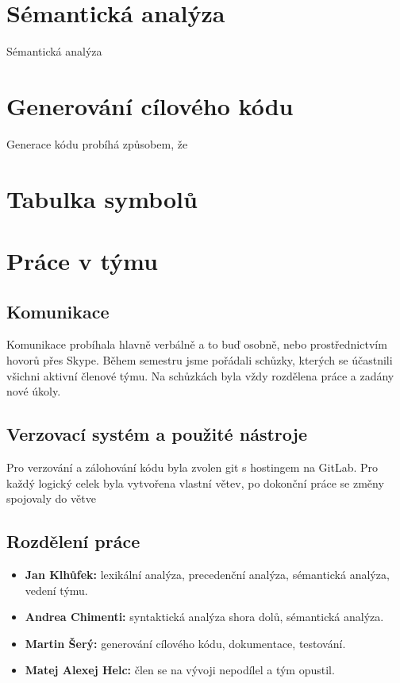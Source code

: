 \documentclass[12pt, a4paper]{article}
\begin{document}
\section{Sémantická analýza}
\justifying
Sémantická analýza 

\section{Generování cílového kódu}
\justifying
Generace kódu probíhá způsobem, že 

\section{Tabulka symbolů}
\justifying


\section{Práce v týmu}
\justifying


\subsection{Komunikace}
\justifying
Komunikace probíhala hlavně verbálně a to buď osobně, nebo prostřednictvím hovorů přes Skype. Během semestru jsme pořádali schůzky, kterých se účastnili všichni aktivní členové týmu. Na schůzkách byla vždy rozdělena práce a zadány nové úkoly.

\subsection{Verzovací systém a použité nástroje}
\justifying
Pro verzování a zálohování kódu byla zvolen git s hostingem na GitLab. Pro každý logický celek byla vytvořena vlastní větev, po dokonční práce se změny spojovaly do větve 

\subsection{Rozdělení práce}
\justifying

\begin{itemize}
    \item \textbf{Jan Klhůfek:} lexikální analýza, precedenční analýza, sémantická analýza, vedení týmu.
    \item \textbf{Andrea Chimenti:} syntaktická analýza shora dolů, sémantická analýza.
    \item \textbf{Martin Šerý:} generování cílového kódu, dokumentace, testování.
    \item \textbf{Matej Alexej Helc:} člen se na vývoji nepodílel a tým opustil.
\end{itemize}
\end{document}
